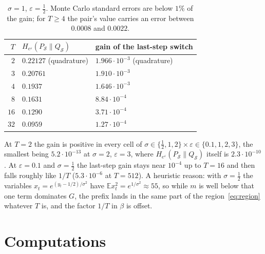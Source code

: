 \documentclass[11pt]{amsart}
\theoremstyle{definition}
\theoremstyle{remark}
\newcommand{\E}{\mathbb E}
\newcommand{\He}{H_{e^{\varepsilon}}}
\begin{document}
\begin{table}[ht]
\centering
\begin{tabular}{rll}
\toprule
$T$ & $\He(P_{\mathcal S}\|Q_{\mathcal S})$ & gain of the last-step switch\\
\midrule
$2$ & $0.22127$ (quadrature) & $1.966\cdot10^{-3}$ (quadrature)\\
$3$ & $0.20761$ & $1.910\cdot10^{-3}$\\
$4$ & $0.1937$ & $1.646\cdot10^{-3}$\\
$8$ & $0.1631$ & $8.84\cdot10^{-4}$\\
$16$ & $0.1290$ & $3.71\cdot10^{-4}$\\
$32$ & $0.0959$ & $1.27\cdot10^{-4}$\\
\bottomrule
\end{tabular}
\medskip
\caption{$\sigma=1$, $\varepsilon=\frac12$. Monte Carlo standard errors are below $1\%$ of the gain; for $T\ge4$ the pair's value carries an error between $0.0008$ and $0.0022$.}
\label{tab:T}
\end{table}

At $T=2$ the gain is positive in every cell of $\sigma\in\{\frac12,1,2\}\times\varepsilon\in\{0.1,1,2,3\}$, the smallest being $5.2\cdot10^{-13}$ at $\sigma=2$, $\varepsilon=3$, where $\He(P_{\mathcal S}\|Q_{\mathcal S})$ itself is $2.3\cdot10^{-10}$. At $\varepsilon=0.1$ and $\sigma=\frac12$ the last-step gain stays near $10^{-4}$ up to $T=16$ and then falls roughly like $1/T$ ($5.3\cdot10^{-6}$ at $T=512$). A heuristic reason: with $\sigma=\frac12$ the variables $x_t=e^{(y_t-1/2)/\sigma^2}$ have $\E x_t^2=e^{1/\sigma^2}\approx55$, so while $m$ is well below that one term dominates $G$, the prefix lands in the same part of the region~\eqref{eq:region} whatever $T$ is, and the factor $1/T$ in $\beta$ is offset.

\section{Computations}\label{sec:checks}
\end{document}
